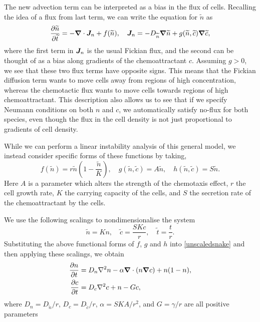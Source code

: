 \documentclass[main.tex]{subfiles}
\begin{document}
The new advection term can be interpreted as a bias in the flux of cells. Recalling the idea of a flux from last term, we can write the equation for $\tilde{n}$ as
\begin{equation}
    \pd{\tilde{n}}{\tilde{t}} = -\vnabla \cdot \v{J}_n + f(\tilde{n}), \quad \v{J}_n = -D_{\tilde{n}}\vnabla\tilde{n}+ g(\tilde{n},\tilde{c})\vnabla \tilde{c},
\end{equation}
where the first term in $\v{J}_n$ is the usual Fickian flux, and the second can be thought of as a bias along gradients of the chemoattractant $c$. Assuming $g>0$, we see that these two flux terms have opposite signs. This means that the Fickian diffusion term wants to move cells away from regions of high concentration, whereas the chemotactic flux wants to move cells towards regions of high chemoattractant. This description also allows us to see that if we specify Neumann conditions on both $n$ and $c$, we automatically satisfy no-flux for both species, even though the flux in the cell density is not just proportional to gradients of cell density.

While we can perform a linear instability analysis of this general model, we instead consider specific forms of these functions by taking,
\begin{equation}
    f(\tilde{n}) = r \tilde{n}\left (1-\frac{\tilde{n}}{K}\right ), \quad g(\tilde{n},\tilde{c}) = A \tilde{n}, \quad h(\tilde{n},\tilde{c}) = S\tilde{n}.
\end{equation}
Here $A$ is a parameter which alters the strength of the chemotaxis effect, $r$ the cell growth rate, $K$ the carrying capacity of the cells, and $S$ the secretion rate of the chemoattractant by the cells. 

We use the following scalings to nondimensionalise the system
\begin{equation}
\tilde{n} = Kn, \quad \tilde{c} = \frac{SKc}{r}, \quad \tilde{t} = \frac{t}{r}.
\end{equation}
 Substituting the above functional forms of $f$, $g$ and $h$ into \cref{unscaledsnake} and then applying these scalings, we obtain
\begin{equation}
\begin{aligned}
\label{scaledsnake}
\pd{{n}}{{t}} &= D_n\nabla^2{n} -\alpha \vnabla\cdot\left(n\vnabla c\right) + n(1-n),\\
\pd{c}{t} &= D_c\nabla^2c + n -  Gc,
\end{aligned}
\end{equation}
where $D_n=D_{\tilde{n}}/r$, $D_c=D_{\tilde{c}}/r$, $\alpha = SKA/r^2$, and $G = \gamma/r $ are all positive parameters
\end{document}

